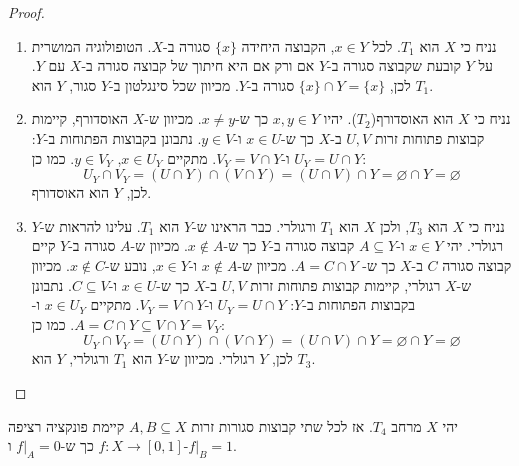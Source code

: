 \documentclass{tstextbook}
\begin{document}
\begin{proof}
  \begin{enumerate}
    \item נניח כי \(X\) הוא \(T_1\). לכל \(x \in Y\), הקבוצה היחידה \(\{x\}\) סגורה ב-\(X\). הטופולוגיה המושרית על \(Y\) קובעת שקבוצה סגורה ב-\(Y\) אם ורק אם היא חיתוך של קבוצה סגורה ב-\(X\) עם \(Y\). לכן, \(\{x\} \cap Y = \{x\}\) סגורה ב-\(Y\). מכיוון שכל סינגלטון ב-\(Y\) סגור, \(Y\) הוא \(T_1\). 


    \item נניח כי \(X\) הוא האוסדורף(\(T_{2}\)). יהיו \(x, y \in Y\) כך ש-\(x \neq y\). מכיוון ש-\(X\) האוסדורף, קיימות קבוצות פתוחות זרות \(U, V\) ב-\(X\) כך ש-\(x \in U\) ו-\(y \in V\). נתבונן בקבוצות הפתוחות ב-\(Y\): \(U_Y = U \cap Y\) ו-\(V_Y = V \cap Y\). מתקיים \(x \in U_Y\), \(y \in V_Y\). כמו כן: 
$$U_Y \cap V_Y = \left( U \cap Y \right) \cap \left( V \cap Y \right) = \left( U \cap V \right) \cap Y = \varnothing  \cap Y = \varnothing $$
לכן, \(Y\) הוא האוסדורף.


    \item נניח כי \(X\) הוא \(T_3\), ולכן \(X\) הוא \(T_1\) ורגולרי. כבר הראינו ש-\(Y\) הוא \(T_1\). עלינו להראות ש-\(Y\) רגולרי. יהי \(x \in Y\) ו-\(A \subseteq Y\) קבוצה סגורה ב-\(Y\) כך ש-\(x \notin A\). מכיוון ש-\(A\) סגורה ב-\(Y\) קיים קבוצה סגורה \(C\) ב-\(X\) כך ש- \(A = C \cap Y\). מכיוון ש-\(x \notin A\) ו-\(x \in Y\), נובע ש-\(x \notin C\). מכיוון ש-\(X\) רגולרי, קיימות קבוצות פתוחות זרות \(U, V\) ב-\(X\) כך ש-\(x \in U\) ו-\(C \subseteq V\). נתבונן בקבוצות הפתוחות ב-\(Y\): \(U_Y = U \cap Y\) ו-\(V_Y = V \cap Y\). מתקיים \(x \in U_Y\) ו-\(A = C \cap Y \subseteq V \cap Y = V_Y\). כמו כן: 
$$U_Y \cap V_Y = \left( U \cap Y \right) \cap \left( V \cap Y \right) = \left( U \cap V \right) \cap Y = \varnothing  \cap Y = \varnothing $$
לכן, \(Y\) רגולרי. מכיוון ש-\(Y\) הוא \(T_1\) ורגולרי, \(Y\) הוא \(T_3\).


  \end{enumerate}
\end{proof}
\begin{proposition}
יהי \(X\) מרחב \(T_4\). אז לכל שתי קבוצות סגורות זרות \(A, B \subseteq X\) קיימת פונקציה רציפה \(f : X \to [0,1]\) כך ש-\(f|_A = 0\) ו-\(f|_B = 1\).

\end{proposition}
\end{document}
